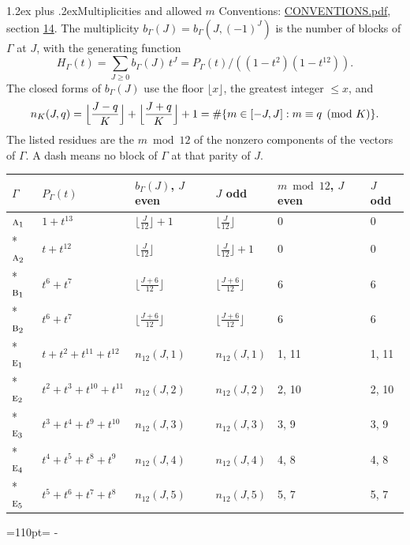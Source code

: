 \documentclass[10pt,a4paper]{article}
\makeatletter
\renewcommand\section{\@startsection{section}{1}{\z@}{-3ex plus -1ex minus -.2ex}%
  {1.2ex plus .2ex}{\normalfont\large\sffamily\bfseries\color{parttitle}}}
\newcommand{\needspace}[1]{\par\penalty-100\begingroup\dimen0=#1\relax\dimen2=\pagegoal
  \advance\dimen2-\pagetotal\ifdim\dimen0>\dimen2\relax\ifdim\dimen2>0pt\vfil\break\fi\fi
  \endgroup}
\numberwithin{equation}{section}
\newcommand{\irr}[1]{\text{\normalfont\scshape #1}}
\makeatother
\begin{document}
\section{Multiplicities and allowed \texorpdfstring{$m$}{m}}\label{s:multiplicities}
Conventions: \href{../../CONVENTIONS.pdf}{CONVENTIONS.pdf}, section \href{../../CONVENTIONS.pdf\#conv.14}{14}.
\leavevmode\label{n:function.generating}\label{n:index.generating.variable}\label{n:function.generating.numerator}The multiplicity $b_\Gamma(J) = b_\Gamma(J, (-1)^J)$ is the number of blocks of $\Gamma$ at $J$, with the generating function
\begin{equation}\label{e:gf}H_\Gamma(t) = \sum_{J\ge0} b_\Gamma(J)\,t^J = P_\Gamma(t)/((1-t^{2})(1-t^{12})).\end{equation}
\leavevmode\label{n:delimiter.floor}\label{n:local.floor.x}\label{n:function.count}\label{n:index.modulus.K}\label{n:index.residue}The closed forms of $b_\Gamma(J)$ use the floor $\lfloor x\rfloor$, the greatest integer $\le x$, and
\begin{equation}\label{e:count}n_K(J,q) = \Bigl\lfloor\frac{J-q}{K}\Bigr\rfloor + \Bigl\lfloor\frac{J+q}{K}\Bigr\rfloor + 1 = \#\{m\in[-J,J] : m\equiv q \pmod{K}\}.\end{equation}
\leavevmode\label{n:head.parity}The listed residues are the $m \bmod 12$ of the nonzero components of the vectors of $\Gamma$. A dash means no block of $\Gamma$ at that parity of $J$.
{\small{\renewcommand{\arraystretch}{1.3}\begin{longtable}{@{}llllll@{}}\toprule
$\Gamma$ & $P_\Gamma(t)$ & $b_\Gamma(J)$, $J$ even & $J$ odd & $m \bmod 12$, $J$ even & $J$ odd\\\midrule\endhead
\bottomrule\endfoot\endlastfoot
$\irr{a}_{1}$ & $1 + t^{13}$ & $\bigl\lfloor\tfrac{J}{12}\bigr\rfloor + 1$ & $\bigl\lfloor\tfrac{J}{12}\bigr\rfloor$ & 0 & 0\\*
$\irr{a}_{2}$ & $t + t^{12}$ & $\bigl\lfloor\tfrac{J}{12}\bigr\rfloor$ & $\bigl\lfloor\tfrac{J}{12}\bigr\rfloor + 1$ & 0 & 0\\*
$\irr{b}_{1}$ & $t^{6} + t^{7}$ & $\bigl\lfloor\tfrac{J+6}{12}\bigr\rfloor$ & $\bigl\lfloor\tfrac{J+6}{12}\bigr\rfloor$ & 6 & 6\\*
$\irr{b}_{2}$ & $t^{6} + t^{7}$ & $\bigl\lfloor\tfrac{J+6}{12}\bigr\rfloor$ & $\bigl\lfloor\tfrac{J+6}{12}\bigr\rfloor$ & 6 & 6\\*
$\irr{e}_{1}$ & $t + t^{2} + t^{11} + t^{12}$ & $n_{12}(J,1)$ & $n_{12}(J,1)$ & 1, 11 & 1, 11\\*
$\irr{e}_{2}$ & $t^{2} + t^{3} + t^{10} + t^{11}$ & $n_{12}(J,2)$ & $n_{12}(J,2)$ & 2, 10 & 2, 10\\*
$\irr{e}_{3}$ & $t^{3} + t^{4} + t^{9} + t^{10}$ & $n_{12}(J,3)$ & $n_{12}(J,3)$ & 3, 9 & 3, 9\\*
$\irr{e}_{4}$ & $t^{4} + t^{5} + t^{8} + t^{9}$ & $n_{12}(J,4)$ & $n_{12}(J,4)$ & 4, 8 & 4, 8\\*
$\irr{e}_{5}$ & $t^{5} + t^{6} + t^{7} + t^{8}$ & $n_{12}(J,5)$ & $n_{12}(J,5)$ & 5, 7 & 5, 7\\
\bottomrule\end{longtable}}}
\needspace{110pt}
\end{document}
